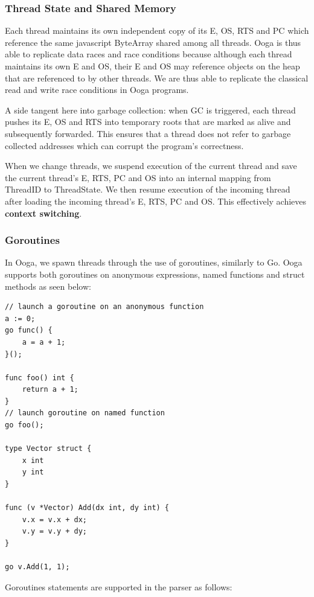 \documentclass{report}
\begin{document}
\subsubsection{Thread State and Shared Memory}

Each thread maintains its own independent copy of its E, OS, RTS and PC which reference the same javascript ByteArray shared among all threads. Ooga is thus able to replicate data races and race conditions because although each thread maintains its own E and OS, their E and OS may reference objects on the heap that are referenced to by other threads. We are thus able to replicate the classical read and write race conditions in Ooga programs.

A side tangent here into garbage collection: when GC is triggered, each thread pushes its E, OS and RTS into temporary roots that are marked as alive and subsequently forwarded. This ensures that a thread does not refer to garbage collected addresses which can corrupt the program's correctness.

When we change threads, we suspend execution of the current thread and save the current thread's E, RTS, PC and OS into an internal mapping from ThreadID to ThreadState. We then resume execution of the incoming thread after loading the incoming thread's E, RTS, PC and OS. This effectively achieves \textbf{context switching}. 

\subsubsection{Goroutines}

In Ooga, we spawn threads through the use of goroutines, similarly to Go. Ooga supports both goroutines on anonymous expressions, named functions and struct methods as seen below:

\begin{verbatim}
// launch a goroutine on an anonymous function
a := 0;
go func() {
    a = a + 1;
}();

func foo() int {
    return a + 1;
}
// launch goroutine on named function
go foo();

type Vector struct {
    x int
    y int
}

func (v *Vector) Add(dx int, dy int) {
    v.x = v.x + dx;
    v.y = v.y + dy;
}

go v.Add(1, 1);
\end{verbatim}

Goroutines statements are supported in the parser as follows:
\end{document}
